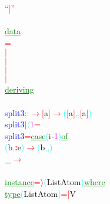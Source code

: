 \textcolor{magenta}{``]''}\\\\\textcolor{green}{\underline{data}}\\\hstab \textcolor{red}{=}\\\hstab \textcolor{red}{\ensuremath{|}}\\\hstab \textcolor{red}{\ensuremath{|}}\\\hstab \textcolor{red}{\ensuremath{|}}\\\hstab \textcolor{red}{\ensuremath{|}}\\\hstab \textcolor{green}{\underline{deriving}}\\\\\textcolor{blue}{split3}\hsspace \textcolor{red}{::}\hsspace \textcolor{red}{\ensuremath{\rightarrow}}\hsspace \textcolor{red}{[}{\rm{}a}\textcolor{red}{]}\hsspace \textcolor{red}{\ensuremath{\rightarrow}}\hsspace \textcolor{cyan}{(}\textcolor{red}{[}{\rm{}a}\textcolor{red}{]}\textcolor{cyan}{,}\textcolor{cyan}{,}\hsspace \textcolor{red}{[}{\rm{}a}\textcolor{red}{]}\textcolor{cyan}{)}\\\textcolor{blue}{split3}\hsspace \textcolor{red}{\ensuremath{|}}\hsspace \textcolor{cyan}{\ensuremath{\langle}}\hsspace \textcolor{magenta}{1}\hsspace \textcolor{red}{=}\\\textcolor{blue}{split3}\hsspace \textcolor{red}{=}\hsspace \textcolor{green}{\underline{case}}\hsspace \textcolor{cyan}{(}{\rm{}i}\textcolor{blue}{{\it{}-}}\textcolor{magenta}{1}\textcolor{cyan}{)}\hsspace \textcolor{green}{\underline{of}}\\\hstab \textcolor{cyan}{(}{\rm{}b}\textcolor{cyan}{,}\textcolor{red}{{\bf{}:}}{\rm{}e}\textcolor{cyan}{)}\hsspace \textcolor{red}{\ensuremath{\rightarrow}}\hsspace \textcolor{cyan}{(}{\rm{}b}\textcolor{cyan}{,}\textcolor{cyan}{,}\textcolor{cyan}{)}\\\hstab \textcolor{green}{\underline{\_}}\hsspace \textcolor{red}{\ensuremath{\rightarrow}}\\\\\textcolor{green}{\underline{instance}}\hsspace \textcolor{red}{=\ensuremath{\rangle}}\hsspace \textcolor{cyan}{(}{\rm{}ListAtom}\textcolor{cyan}{)}\hsspace \textcolor{green}{\underline{where}}\\\hstab \textcolor{green}{\underline{type}}\hsspace \textcolor{cyan}{(}{\rm{}ListAtom}\textcolor{cyan}{)}\hsspace \textcolor{red}{=}\hsspace \textcolor{red}{[}{\rm{}V}\hsspace 